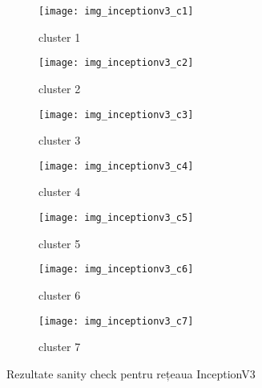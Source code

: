 \begin{figure}[!h]
  \centering
  \begin{subfigure}[b]{0.45\textwidth}
    \texttt{[image: img\_inceptionv3\_c1]}
    \caption{cluster 1}
  \end{subfigure}
  \hfill
  \begin{subfigure}[b]{0.45\textwidth}
    \texttt{[image: img\_inceptionv3\_c2]}
    \caption{cluster 2}
  \end{subfigure}
   \hfill
  \begin{subfigure}[b]{0.45\textwidth}
    \texttt{[image: img\_inceptionv3\_c3]}
    \caption{cluster 3}
  \end{subfigure}
  \hfill
  \begin{subfigure}[b]{0.45\textwidth}
    \texttt{[image: img\_inceptionv3\_c4]}
    \caption{cluster 4}
  \end{subfigure}
  \hfill
  \begin{subfigure}[b]{0.45\textwidth}
    \texttt{[image: img\_inceptionv3\_c5]}
    \caption{cluster 5}
  \end{subfigure}
  \hfill
  \begin{subfigure}[b]{0.45\textwidth}
    \texttt{[image: img\_inceptionv3\_c6]}
    \caption{cluster 6}
  \end{subfigure}
    \hfill
  \begin{subfigure}[b]{0.45\textwidth}
    \texttt{[image: img\_inceptionv3\_c7]}
    \caption{cluster 7}
  \end{subfigure}
  \caption[Rezultate sanity check pentru rețeaua InceptionV3]{Rezultate sanity check pentru rețeaua InceptionV3}
\end{figure}

